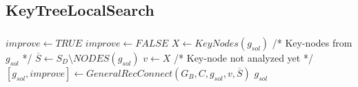 \subsection{KeyTreeLocalSearch}
\begin{frame}\frametitle{}
\begin{block}{}
\begin{algorithm}[H]
\caption{$g_{sol} = KeyTreeLocalSearch(G_B,C,g_{sol})$}
\begin{algorithmic}[1]
\begin{scriptsize}
\STATE $improve \leftarrow TRUE$
\STATE $improve \leftarrow FALSE$
\STATE $ X \leftarrow KeyNodes(g_{sol})$ /* Key-nodes from $g_{sol}$ */
\STATE $\overline{S} \leftarrow S_D \setminus NODES(g_{sol})$
\STATE $v \leftarrow X$ /* Key-node not analyzed yet */
\STATE $[g_{sol},improve] \leftarrow GeneralRecConnect(G_B,C,g_{sol},v,\overline{S})$
\ENDWHILE
\ENDWHILE
\RETURN $g_{sol}$
\end{scriptsize}
\end{algorithmic}
\end{algorithm}
\end{block}
\end{frame}


